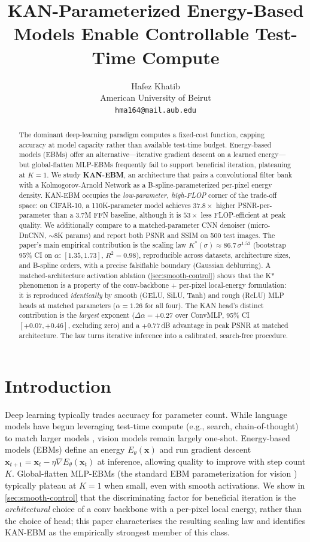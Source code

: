 \documentclass{article}
\title{KAN-Parameterized Energy-Based Models Enable Controllable Test-Time Compute}
\author{%
  Hafez Khatib \\
  American University of Beirut \\
  \texttt{hma164@mail.aub.edu}
}
\newcommand{\xx}{\mathbf{x}}
\begin{document}
\maketitle

\begin{abstract}
The dominant deep-learning paradigm computes a fixed-cost function, capping accuracy at model capacity rather than available test-time budget. Energy-based models (EBMs) offer an alternative---iterative gradient descent on a learned energy---but global-flatten MLP-EBMs frequently fail to support beneficial iteration, plateauing at $K{=}1$. We study \textbf{KAN-EBM}, an architecture that pairs a convolutional filter bank with a Kolmogorov-Arnold Network as a B-spline-parameterized per-pixel energy density. KAN-EBM occupies the \emph{low-parameter, high-FLOP} corner of the trade-off space: on CIFAR-10, a 110K-parameter model achieves $37.8{\times}$ higher PSNR-per-parameter than a 3.7M FFN baseline, although it is $53{\times}$ less FLOP-efficient at peak quality. We additionally compare to a matched-parameter CNN denoiser (micro-DnCNN, $\sim$8K params) and report both PSNR and SSIM on 500 test images. The paper's main empirical contribution is the scaling law $K^{*}(\sigma) \approx 86.7\,\sigma^{1.53}$ (bootstrap 95\% CI on $\alpha$: $[1.35, 1.73]$, $R^{2}{=}0.98$), reproducible across datasets, architecture sizes, and B-spline orders, with a precise falsifiable boundary (Gaussian deblurring). A matched-architecture activation ablation (\cref{sec:smooth-control}) shows that the K* phenomenon is a property of the conv-backbone + per-pixel local-energy formulation: it is reproduced \emph{identically} by smooth (GELU, SiLU, Tanh) and rough (ReLU) MLP heads at matched parameters ($\alpha{=}1.26$ for all four). The KAN head's distinct contribution is the \emph{largest} exponent ($\Delta\alpha = +0.27$ over ConvMLP, 95\% CI $[+0.07, +0.46]$, excluding zero) and a $+0.77$\,dB advantage in peak PSNR at matched architecture. The law turns iterative inference into a calibrated, search-free procedure.
\end{abstract}

\section{Introduction}
Deep learning typically trades accuracy for parameter count. While language models have begun leveraging test-time compute (e.g., search, chain-of-thought) to match larger models \citep{snell2024llm}, vision models remain largely one-shot. Energy-based models (EBMs) define an energy $E_\theta(\xx)$ and run gradient descent $\xx_{t+1} = \xx_t - \eta\nabla E_\theta(\xx_t)$ at inference, allowing quality to improve with step count $K$. Global-flatten MLP-EBMs (the standard EBM parameterization for vision \citep{du2019implicit}) typically plateau at $K{=}1$ when small, even with smooth activations. We show in \cref{sec:smooth-control} that the discriminating factor for beneficial iteration is the \emph{architectural} choice of a conv backbone with a per-pixel local energy, rather than the choice of head; this paper characterises the resulting scaling law and identifies KAN-EBM as the empirically strongest member of this class.
\end{document}
